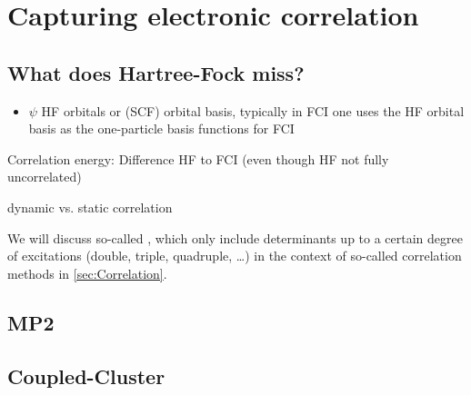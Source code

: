 \section{Capturing electronic correlation}
\label{sec:Correlation}

\subsection{What does Hartree-Fock miss?}







\begin{itemize}
\item
$\psi$ HF orbitals or (SCF) orbital basis,
typically in FCI one uses the HF orbital basis as the one-particle basis functions for FCI
	\end{itemize}



Correlation energy: Difference HF to FCI
(even though HF not fully uncorrelated)

dynamic vs. static correlation


We will discuss so-called ,
which only include determinants up to a certain
degree of excitations (double, triple, quadruple, \ldots)
in the context of so-called correlation methods in \vref{sec:Correlation}.


\subsection{MP2}

\subsection{Coupled-Cluster}

